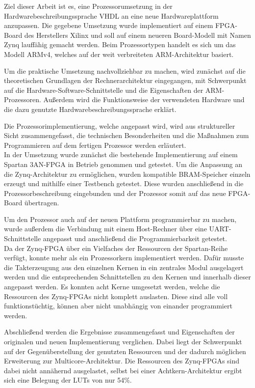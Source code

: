 \documentclass[11pt,a4paper,titlepage]{article}
\begin{document}
Ziel dieser Arbeit ist es, eine Prozessorumsetzung in der Hardwarebeschreibungssprache VHDL an eine neue Hardwareplattform anzupassen. Die gegebene Umsetzung wurde implementiert auf einem FPGA-Board des Herstellers Xilinx und soll auf einem neueren Board-Modell mit Namen Zynq lauffähig gemacht werden. Beim Prozessortypen handelt es sich um das Modell ARMv4, welches auf der weit verbreiteten ARM-Architektur basiert.

Um die praktische Umsetzung nachvollziehbar zu machen, wird zunächst auf die theoretischen Grundlagen der Rechnerarchitektur eingegangen, mit Schwerpunkt auf die Hardware-Software-Schnittstelle und die Eigenschaften der ARM-Prozessoren. Außerdem wird die Funktionsweise der verwendeten Hardware und die dazu genutzte Hardwarebeschreibungssprache erklärt.

Die Prozessorimplementierung, welche angepasst wird, wird aus struktureller Sicht zusammengefasst, die technischen Besonderheiten und die Maßnahmen zum Programmieren auf dem fertigen Prozessor werden erläutert.\\

In der Umsetzung wurde zunächst die bestehende Implementierung auf einem Spartan 3AN-FPGA in Betrieb genommen und getestet. Um die Anpassung an die Zynq-Architektur zu ermöglichen, wurden kompatible BRAM-Speicher einzeln erzeugt und mithilfe einer Testbench getestet. Diese wurden anschließend in die Prozessorbeschreibung eingebunden und der Prozessor somit auf das neue FPGA-Board übertragen. 

Um den Prozessor auch auf der neuen Plattform programmierbar zu machen, wurde außerdem die Verbindung mit einem Host-Rechner über eine UART-Schnittstelle angepasst und anschließend die Programmierbarkeit getestet.\\

Da der Zynq-FPGA über ein Vielfaches der Ressourcen der Spartan-Reihe verfügt, konnte mehr als ein Prozessorkern implementiert werden. Dafür musste die Takterzeugung aus den einzelnen Kernen in ein zentrales Modul ausgelagert werden und die entsprechenden Schnittstellen zu den Kernen und innerhalb dieser angepasst werden. Es konnten acht Kerne umgesetzt werden, welche die Ressourcen des Zynq-FPGAs nicht komplett auslasten. Diese sind alle voll funktionstüchtig, können aber nicht unabhängig von einander programmiert werden.

Abschließend werden die Ergebnisse zusammengefasst und Eigenschaften der originalen und neuen Implementierung verglichen. Dabei liegt der Schwerpunkt auf der Gegenüberstellung der genutzten Ressourcen und der dadurch möglichen Erweiterung zur Multicore-Architektur. Die Ressourcen des Zynq-FPGAs sind dabei nicht annähernd ausgelastet, selbst bei einer Achtkern-Architektur ergibt sich eine Belegung der LUTs von nur 54\%.
\end{document}
